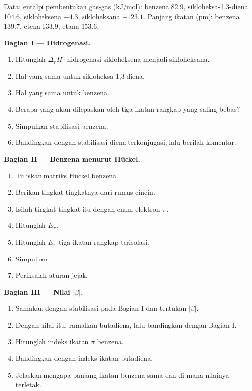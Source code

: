 \begin{problem}
\label{pb:b2:huckel:1}
Data: entalpi pembentukan gas-gas (\unit{kJ/mol}): benzena 82.9,
sikloheksa-1,3-diena 104.6, sikloheksena $-4.3$, sikloheksana $-123.1$.
Panjang ikatan (pm): benzena 139.7, etena 133.9, etana 153.6.

\medskip
\noindent\textbf{Bagian I --- Hidrogenasi.}
\begin{enumerate}
  \item Hitunglah $\Delta_r H^\circ$ hidrogenasi sikloheksena menjadi
        sikloheksana.
  \item Hal yang sama untuk sikloheksa-1,3-diena.
  \item Hal yang sama untuk benzena.
  \item Berapa yang akan dilepaskan oleh tiga ikatan rangkap yang saling
        bebas?
  \item Simpulkan stabilisasi benzena.
  \item Bandingkan dengan stabilisasi diena terkonjugasi, lalu berilah
        komentar.
\end{enumerate}

\medskip
\noindent\textbf{Bagian II --- Benzena menurut Hückel.}
\begin{enumerate}[resume]
  \item Tuliskan matriks Hückel benzena.
  \item Berikan tingkat-tingkatnya dari rumus cincin.
  \item Isilah tingkat-tingkat itu dengan enam elektron $\pi$.
  \item Hitunglah $E_\pi$.
  \item Hitunglah $E_\pi$ tiga ikatan rangkap terisolasi.
  \item Simpulkan .
  \item Periksalah aturan jejak.
\end{enumerate}

\medskip
\noindent\textbf{Bagian III --- Nilai $|\beta|$.}
\begin{enumerate}[resume]
  \item Samakan  dengan stabilisasi pada Bagian I dan
        tentukan $|\beta|$.
  \item Dengan nilai itu, ramalkan  butadiena, lalu
        bandingkan dengan Bagian I.
  \item Hitunglah indeks ikatan $\pi$ benzena.
  \item Bandingkan dengan indeks ikatan butadiena.
  \item Jelaskan mengapa panjang ikatan benzena sama dan di mana nilainya
        terletak.
\end{enumerate}


\end{problem}
